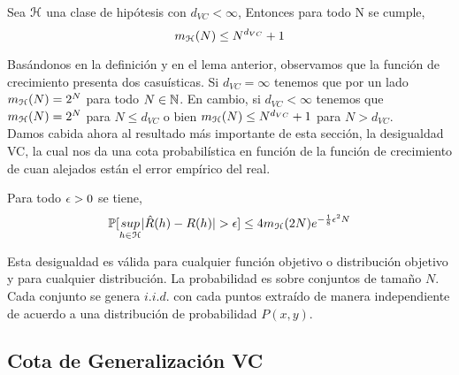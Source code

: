     \begin{corolario}\label{corolario:cotapolinomicaVC}
    Sea $\mathcal{H}$ una clase de hipótesis con $d_{VC} < \infty$, Entonces para todo N se cumple,
    \begin{equation}
        m_{\mathcal{H}}(N) \leq N^{d_{VC}} + 1
    \end{equation}
    \end{corolario}
    
    Basándonos en la definición y en el lema anterior, observamos que la función de crecimiento presenta dos casuísticas. Si ${d_{VC} = \infty}$ tenemos que por un lado ${m_{\mathcal{H}}(N) = 2^N}$ para todo ${N \in \mathbb{N}}$. En cambio, si $d_{VC} < \infty$ tenemos que ${m_{\mathcal{H}}(N) = 2^N}$ para ${N \leq d_{VC}}$ o bien ${m_{\mathcal{H}}(N) \leq N^{d_{VC}}+1}$ para ${N > d_{VC}}$. \\
    
    Damos cabida ahora al resultado más importante de esta sección, la desigualdad VC, la cual nos da una cota probabilística en función de la función de crecimiento de cuan alejados están el error empírico del real. \\
    
    \begin{teorema}[Desigualdad VC]\label{teorema:VCDes}
    Para todo $\epsilon > 0$ se tiene,
    \begin{equation}
        \mathbb{P}[\underset{h \in \mathcal{H}}{sup} |\hat{R}(h) - R(h)| > \epsilon] \leq 4 m_{\mathcal{H}}(2N)e^{-\frac{1}{8}\epsilon^2N}
    \end{equation}
    \end{teorema}
    
    Esta desigualdad es válida para cualquier función objetivo o distribución objetivo y para cualquier distribución. La probabilidad es sobre conjuntos de tamaño $N$. Cada conjunto se genera $i.i.d.$ con cada puntos extraído de manera independiente de acuerdo a una distribución de probabilidad $P(x,y)$. \\
    
    


    
    
\subsection{Cota de Generalización VC}    

